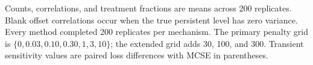 \par\smallskip
\footnotesize{Counts, correlations, and treatment fractions are means across 200 replicates. Blank offset correlations occur when the true persistent level has zero variance. Every method completed 200 replicates per mechanism. The primary penalty grid is $\{0,0.03,0.10,0.30,1,3,10\}$; the extended grid adds 30, 100, and 300. Transient sensitivity values are paired loss differences with MCSE in parentheses.}
\endgroup
